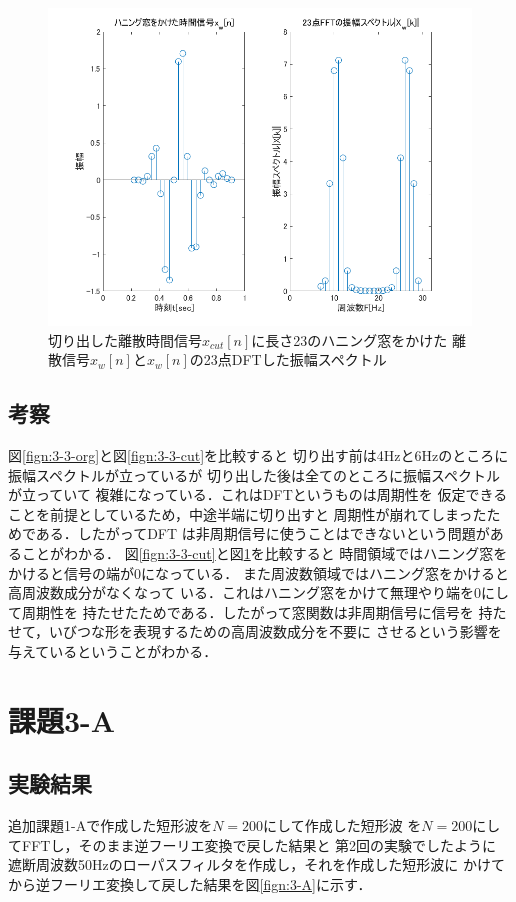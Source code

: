 \documentclass[11pt, a4paper, titlepage]{ltjsarticle}
\begin{document}
\begin{figure}[h]
    \centering
    \includegraphics[width=0.9\linewidth]{figures/3-3-mado.png}
    \caption{切り出した離散時間信号$x_{cut}[n]$に長さ23のハニング窓をかけた
    離散信号$x_{w}[n]$と$x_{w}[n]$の23点DFTした振幅スペクトル}
    \label{fign:3-3-mado}
\end{figure}

\newpage
\subsection*{考察}
図\ref*{fign:3-3-org}と図\ref*{fign:3-3-cut}を比較すると
切り出す前は4Hzと6Hzのところに振幅スペクトルが立っているが
切り出した後は全てのところに振幅スペクトルが立っていて
複雑になっている．これはDFTというものは周期性を
仮定できることを前提としているため，中途半端に切り出すと
周期性が崩れてしまったためである．したがってDFT
は非周期信号に使うことはできないという問題があることがわかる．
図\ref*{fign:3-3-cut}と図\ref*{fign:3-3-mado}を比較すると
時間領域ではハニング窓をかけると信号の端が0になっている．
また周波数領域ではハニング窓をかけると高周波数成分がなくなって
いる．これはハニング窓をかけて無理やり端を0にして周期性を
持たせたためである．したがって窓関数は非周期信号に信号を
持たせて，いびつな形を表現するための高周波数成分を不要に
させるという影響を与えているということがわかる．


\newpage
\section*{課題3-A}
\subsection*{実験結果}
追加課題1-Aで作成した短形波を$N=200$にして作成した短形波
を$N=200$にしてFFTし，そのまま逆フーリエ変換で戻した結果と
第2回の実験でしたように
遮断周波数50Hzのローパスフィルタを作成し，それを作成した短形波に
かけてから逆フーリエ変換して戻した結果を図\ref*{fign:3-A}に示す．
\end{document}
